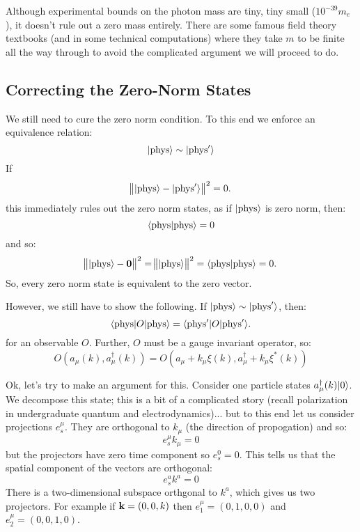Although experimental bounds on the photon mass are tiny, tiny small ($10^{-39}m_e$), it doesn't rule out a zero mass entirely. There are some famous field theory textbooks (and in some technical computations) where they take $m$ to be finite all the way through to avoid the complicated argument we will proceed to do.

\subsection{Correcting the Zero-Norm States}
We still need to cure the zero norm condition. To this end we enforce an equivalence relation:
\begin{equation}
    \lvert \text{phys} \rangle \sim \lvert \text{phys}' \rangle
\end{equation}
If
\begin{equation}
    \norm{\lvert \text{phys} \rangle - \lvert \text{phys}' \rangle}^2 = 0.
\end{equation}
this immediately rules out the zero norm states, as if $\lvert \text{phys} \rangle$ is zero norm, then:
\begin{equation}
    \langle \text{phys} \lvert \text{phys} \rangle = 0
\end{equation}
and so:
\begin{equation}
    \norm{\lvert \text{phys} \rangle - \mathbf{0}}^2 =  \norm{\lvert \text{phys} \rangle}^2 = \langle \text{phys} \lvert \text{phys} \rangle = 0.
\end{equation}
So, every zero norm state is equivalent to the zero vector.

However, we still have to show the following. If $\lvert \text{phys} \rangle \sim \lvert \text{phys}' \rangle$, then:
\begin{equation}
    \langle \text{phys} \rvert O\lvert \text{phys} \rangle = \langle \text{phys}' \rvert O\lvert \text{phys}' \rangle.
\end{equation}
for an observable $O$. Further, $O$ must be a gauge invariant operator, so:
\begin{equation}
    O(a_\mu(k), a_\mu^\dag(k)) = O(a_\mu + k_\mu \xi(k), a_\mu^\dag + k_\mu \xi^*(k))
\end{equation}

Ok, let's try to make an argument for this. Consider one particle states $a_\mu^\dagger(k)\lvert 0 \rangle$. We decompose this state; this is a bit of a complicated story (recall polarization in undergraduate quantum and electrodynamics)... but to this end let us consider projections $e^\mu_s$. They are orthogonal to $k_\mu$ (the direction of propogation) and so:
\begin{equation}
    e^\mu_s k_\mu = 0
\end{equation}
but the projectors have zero time component so $e^0_s = 0$. This tells us that the spatial component of the vectors are orthogonal:
\begin{equation}
    e^a_sk^a = 0
\end{equation}
There is a two-dimensional subspace orthgonal to $k^a$, which gives us two projectors. For example if $\mathbf{k} = (0, 0, k)$ then $e^\mu_1 = (0, 1, 0, 0)$ and $e^\mu_2 = (0, 0, 1, 0)$. 

